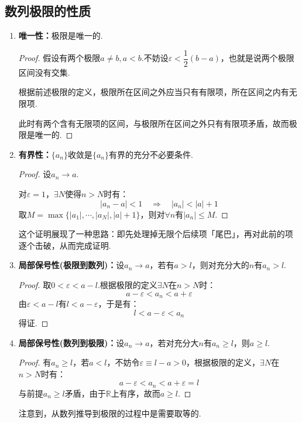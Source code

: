 \subsection{数列极限的性质}
\begin{enumerate}[property]
    \item \textbf{唯一性：}极限是唯一的.
    \begin{proof}
        假设有两个极限$a \neq b, a<b$.不妨设$\varepsilon < \dfrac{1}{2}(b-a)$，也就是说两个极限区间没有交集.
        
        根据前述极限的定义，极限所在区间之外应当只有有限项，所在区间之内有无限项.

        此时有两个含有无限项的区间，与极限所在区间之外只有有限项矛盾，故而极限是唯一的.
    \end{proof}

    
    \item \textbf{有界性：}$\{a_n\}$收敛是$\{a_n\}$有界的充分不必要条件.
    \begin{proof}
        设$a_n \to a$.

        对$\varepsilon = 1$，$\exists N$使得$n>N$时有：
        \[|a_n - a|<1 \quad\Rightarrow\quad |a_n|<|a|+1\]
        取$M = \max\{|a_1|, \cdots, |a_N|, |a|+1\}$，则对$\forall n$有$|a_n| \leqslant M$.
    \end{proof}

    这个证明展现了一种思路：即先处理掉无限个后续项「尾巴」，再对此前的项逐个击破，从而完成证明.

    \item \textbf{局部保号性(极限到数列)：}设$a_n \to a$，若有$a>l$，则对充分大的$n$有$a_n>l$.
    \begin{proof}
        取$0 < \varepsilon < a-l$.根据极限的定义$\exists N$在$n>N$时：
        \[a-\varepsilon < a_n < a+\varepsilon\]
        由$\varepsilon < a-l$有$l < a-\varepsilon$，于是有：
        \[l < a-\varepsilon < a_n\]
        得证.
    \end{proof}

    \item \textbf{局部保号性(数列到极限)：}设$a_n \to a$，若对充分大$n$有$a_n \geqslant l$，则$a \geqslant l$.
    \begin{proof}
        有$a_n \geqslant l$，若$a < l$，不妨令$\varepsilon \equiv l-a > 0$，根据极限的定义，$\exists N$在$n>N$时有：
        \[a-\varepsilon < a_n < a+\varepsilon = l\]
        与前提$a_n \geqslant l$矛盾，由于$\mathbb{R}$上有序，故而$a \geqslant l$.
    \end{proof}
    注意到，从数列推导到极限的过程中是需要取等的.


\end{enumerate}
